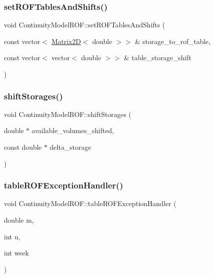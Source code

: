 \subsubsection{\texorpdfstring{set\+R\+O\+F\+Tables\+And\+Shifts()}{setROFTablesAndShifts()}}
{\footnotesize\ttfamily void Continuity\+Model\+R\+O\+F\+::set\+R\+O\+F\+Tables\+And\+Shifts (\begin{DoxyParamCaption}\item[{const vector$<$ \mbox{\hyperlink{classMatrix2D}{Matrix2D}}$<$ double $>$$>$ \&}]{storage\+\_\+to\+\_\+rof\+\_\+table,  }\item[{const vector$<$ vector$<$ double $>$$>$ \&}]{table\+\_\+storage\+\_\+shift }\end{DoxyParamCaption})}

\mbox{\label{classContinuityModelROF_a4f2b25687bcdeb4a88e22397c84789de_a4f2b25687bcdeb4a88e22397c84789de}} 
\subsubsection{\texorpdfstring{shift\+Storages()}{shiftStorages()}}
{\footnotesize\ttfamily void Continuity\+Model\+R\+O\+F\+::shift\+Storages (\begin{DoxyParamCaption}\item[{double $\ast$}]{available\+\_\+volumes\+\_\+shifted,  }\item[{const double $\ast$}]{delta\+\_\+storage }\end{DoxyParamCaption})}

\mbox{\label{classContinuityModelROF_a10a8a95f3177d305d3881e654f01d65d_a10a8a95f3177d305d3881e654f01d65d}} 
\subsubsection{\texorpdfstring{table\+R\+O\+F\+Exception\+Handler()}{tableROFExceptionHandler()}}
{\footnotesize\ttfamily void Continuity\+Model\+R\+O\+F\+::table\+R\+O\+F\+Exception\+Handler (\begin{DoxyParamCaption}\item[{double}]{m,  }\item[{int}]{u,  }\item[{int}]{week }\end{DoxyParamCaption})}

